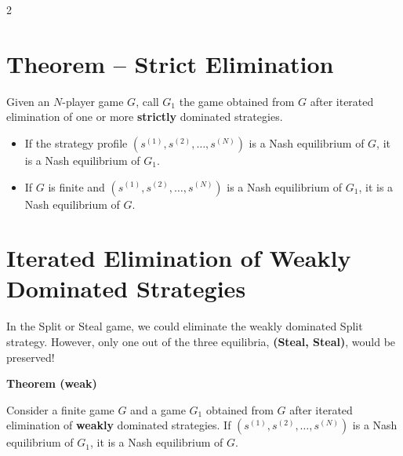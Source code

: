 \documentclass[a4paper,9pt]{extarticle}
\begin{document}
\begin{multicols}{2}
\section{Theorem -- Strict Elimination}


\begin{important}

Given an $N$-player game $G$, call $G_1$ the game obtained from $G$ after iterated
elimination of one or more \textbf{strictly} dominated strategies.

\begin{itemize}

\item If the strategy profile $(s^{(1)}, s^{(2)}, \dots, s^{(N)})$ is a Nash equilibrium of
$G$, it is a Nash equilibrium of $G_1$.

\item If $G$ is finite and $(s^{(1)}, s^{(2)}, \dots, s^{(N)})$ is a Nash equilibrium of
$G_1$, it is a Nash equilibrium of $G$.

\end{itemize}

\end{important}



\section{Iterated Elimination of Weakly Dominated Strategies}


\begin{warning}

In the Split or Steal game, we could eliminate the weakly dominated Split strategy. However,
only one out of the three equilibria, \textbf{(Steal, Steal)}, would be preserved!

\end{warning}


\begin{important}

\textbf{Theorem (weak)}

Consider a finite game $G$ and a game $G_1$ obtained from $G$ after iterated elimination of
\textbf{weakly} dominated strategies. If $(s^{(1)}, s^{(2)}, \dots, s^{(N)})$ is a Nash
equilibrium of $G_1$, it is a Nash equilibrium of $G$.

\end{important}


\begin{warning}


\end{warning}
\end{multicols}
\end{document}
